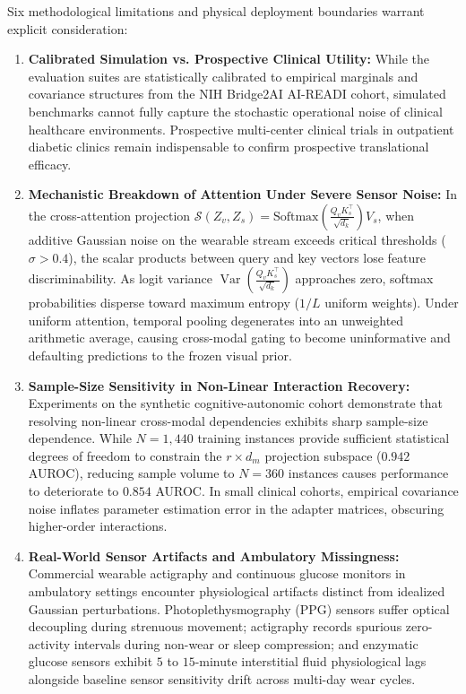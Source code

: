 \documentclass[journal,10pt,twocolumn]{IEEEtran}
\begin{document}
Six methodological limitations and physical deployment boundaries warrant explicit consideration:
\begin{enumerate}
    \item \textbf{Calibrated Simulation vs. Prospective Clinical Utility:} While the evaluation suites are statistically calibrated to empirical marginals and covariance structures from the NIH Bridge2AI AI-READI cohort, simulated benchmarks cannot fully capture the stochastic operational noise of clinical healthcare environments. Prospective multi-center clinical trials in outpatient diabetic clinics remain indispensable to confirm prospective translational efficacy.
    \item \textbf{Mechanistic Breakdown of Attention Under Severe Sensor Noise:} In the cross-attention projection $\mathcal{S}(Z_v, Z_s) = \text{Softmax}\left(\frac{Q_v K_s^\top}{\sqrt{d_k}}\right) V_s$, when additive Gaussian noise on the wearable stream exceeds critical thresholds ($\sigma > 0.4$), the scalar products between query and key vectors lose feature discriminability. As logit variance $\operatorname{Var}\left(\frac{Q_v K_s^\top}{\sqrt{d_k}}\right)$ approaches zero, softmax probabilities disperse toward maximum entropy ($1/L$ uniform weights). Under uniform attention, temporal pooling degenerates into an unweighted arithmetic average, causing cross-modal gating to become uninformative and defaulting predictions to the frozen visual prior.
    \item \textbf{Sample-Size Sensitivity in Non-Linear Interaction Recovery:} Experiments on the synthetic cognitive-autonomic cohort demonstrate that resolving non-linear cross-modal dependencies exhibits sharp sample-size dependence. While $N=1{,}440$ training instances provide sufficient statistical degrees of freedom to constrain the $r \times d_m$ projection subspace ($0.942$ AUROC), reducing sample volume to $N=360$ instances causes performance to deteriorate to $0.854$ AUROC. In small clinical cohorts, empirical covariance noise inflates parameter estimation error in the adapter matrices, obscuring higher-order interactions.
    \item \textbf{Real-World Sensor Artifacts and Ambulatory Missingness:} Commercial wearable actigraphy and continuous glucose monitors in ambulatory settings encounter physiological artifacts distinct from idealized Gaussian perturbations. Photoplethysmography (PPG) sensors suffer optical decoupling during strenuous movement; actigraphy records spurious zero-activity intervals during non-wear or sleep compression; and enzymatic glucose sensors exhibit $5$ to $15$-minute interstitial fluid physiological lags alongside baseline sensor sensitivity drift across multi-day wear cycles.

\end{enumerate}
\end{document}
